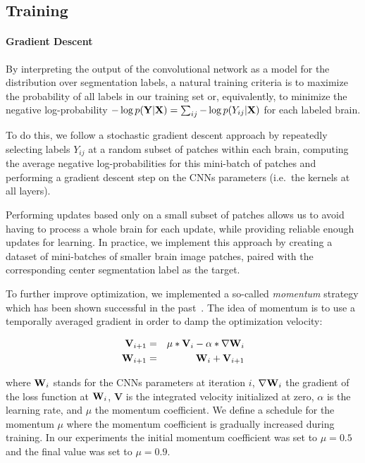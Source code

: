 \documentclass[final,5p,times,twocolumn]{elsarticle}
\begin{document}
\subsection{Training}
\label{sec:training}


\paragraph{Gradient Descent}

By interpreting the output of the convolutional network as a model for the distribution over segmentation labels, a natural training criteria is to maximize the probability of all labels in our training set or, equivalently, to minimize the negative log-probability $-\log p({\bf Y}|{\bf X}) = \sum_{ij} -\log p(Y_{ij}|{\bf X})$ for each labeled brain.



To do this, we follow a stochastic gradient descent approach by repeatedly selecting labels $Y_{ij}$ at a random subset of patches within each brain, computing the average negative log-probabilities for this mini-batch of patches and performing a gradient descent step on the CNNs parameters (i.e.\ the kernels at all layers).


Performing updates based only on a small subset of patches allows us to avoid having to process a whole brain for each update, while providing reliable enough updates for learning. In practice, we implement this approach by creating a dataset of mini-batches of smaller brain image patches, paired with the corresponding center segmentation label as the target.

To further improve optimization, we implemented a so-called {\em momentum} strategy which has been shown successful in the past~\citep{Krizhevsky-2012-small}.  The idea of momentum is to use a temporally averaged gradient in order to damp the optimization velocity:

\begin{eqnarray}
{\bf V}_{i+1} & = & \mu * {\bf V}_i - \alpha * \nabla {\bf W}_i \nonumber \\
{\bf W}_{i+1} & = & {\bf W}_{i}+{\bf V}_{i+1} \nonumber
\end{eqnarray}



where ${\bf W}_i$ stands for the CNNs parameters at iteration $i$, $ \nabla{\bf W}_i$ the gradient of the loss function at ${\bf W}_i$, {\bf V} is the integrated velocity initialized at zero, $\alpha$ is the learning rate, and $\mu$ the momentum coefficient.  We define a schedule for the  momentum $\mu$ where the momentum coefficient is gradually increased during training. In our experiments the initial momentum coefficient was set to $\mu=0.5$ and the final value was set to $\mu=0.9$.
\end{document}
